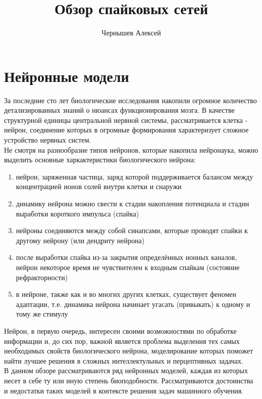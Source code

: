 \documentclass[a4paper,10pt]{article}
\title{Обзор спайковых сетей}
\author{Чернышев Алексей}
\begin{document}


\tableofcontents
\clearpage
\section{Нейронные модели}

	\indent За последние сто лет биологические исследования накопили огромное количество детализированных знаний о нюансах функционирования мозга. В качестве структурной единицы центральной нервной системы, рассматривается клетка - нейрон, соединение которых в огромные формирования характеризует сложное  устройство нервных систем.\\
	\indent Не смотря на разнообразие типов нейронов, которые накопила нейронаука, можно выделить основные харкактеристики биологического нейрона:
	\begin{enumerate}
	\item нейрон, заряженная частица, заряд которой поддерживается балансом между концентрацией ионов солей внутри клетки и снаружи
	\item динамику нейрона можно свести к стадии накопления потенциала и стадии выработки короткого импульса	 (спайка)
	\item нейроны соединяются между собой синапсами, которые проводят спайки к другому нейрону (или дендриту нейрона)
	\item после выработки спайка из-за закрытия определённых ионных каналов, нейрон некоторое время не чувствителен к входным спайкам (состояние рефракторности)
	\item в нейроне, также как и во многих других клетках, существует феномен адаптации, т.е. динамика нейрона начинает угасать (привыкать) к одному и тому же стимулу
	\end{enumerate}
	Нейрон, в первую очередь, интересен своими возможностями по обработке информации и, до сих пор, важной является проблема выделения тех самых необходимых свойств биологического нейрона, моделирование которых поможет найти лучшее решения в сложных интеллектульных и перцептивных задачах.\\
	\indent В данном обзоре рассматриваются ряд нейронных моделей, каждая из которых несет в себе ту или иную степень биоподобности. Рассматриваются достоинства и недостатки таких моделей в контексте решения задач машинного обучения.
	
		
\end{document}
